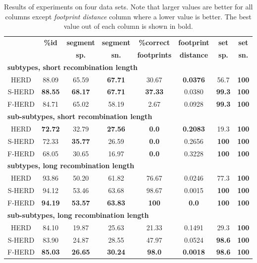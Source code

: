 \begin{table}
\begin{center}
\begin{tabular}{cccccccc}\hline
&{\bf \%id}&\bf segment&\bf segment&\bf \%correct&\bf footprint&\bf set&\bf  set\\ 
&&\bf sp.& \bf sn.& \bf footprints&\bf distance&\bf    sp.&\bf  sn.\\ 
\hline
\hline
\multicolumn{8}{l}{\bf subtypes, short recombination length}\\
HERD   &88.09& 65.59& {\bf 67.71}& 30.67& {\bf 0.0376}& 56.7&{\bf 100}\\
S-HERD &{\bf 88.55}& {\bf 68.17}& {\bf 67.71}& {\bf 37.33}& 0.0380& {\bf 99.3}&{\bf 100}\\
F-HERD &84.71& 65.02& 58.19& 2.67& 0.0928& {\bf 99.3}&{\bf 100}\\\hline
\multicolumn{8}{l}{\bf sub-subtypes, short recombination length}\\
HERD   &{\bf 72.72}& 32.79& {\bf 27.56}& {\bf 0.0}&    {\bf 0.2083}& 19.3&{\bf 100}\\
S-HERD &72.33&{\bf 35.77}& 26.59& {\bf 0.0}&    0.2656& {\bf 100}&{\bf 100}\\
F-HERD &68.05&30.65& 16.97& {\bf 0.0}&    0.3228& {\bf 100}&{\bf 100}\\\hline
\multicolumn{8}{l}{\bf subtypes, long recombination length}\\
HERD   &93.86& 50.20& 61.82& 76.67& 0.0246& 77.3&{\bf 100}\\
S-HERD &94.12& 53.46& 63.68& 98.67& 0.0015&   {\bf 100}&{\bf 100}\\
F-HERD &{\bf 94.19}& {\bf 53.57}& {\bf 63.83}& {\bf 100}&    {\bf 0.0}&
{\bf 100}&{\bf 100}\\\hline
\multicolumn{8}{l}{\bf sub-subtypes, long recombination length}\\
HERD   &84.10& 19.87& 25.63& 21.33& 0.1491& 29.3&{\bf 100}\\
S-HERD &83.90& 24.87& 28.55& 47.97& 0.0524& {\bf 98.6}&{\bf 100}\\
F-HERD &{\bf 85.03}& {\bf 26.65}& {\bf 30.24}& {\bf 98.0}&   {\bf 0.0018}& {\bf
98.6}&{\bf 100}\\
\end{tabular}
\end{center}
\caption[Results of F/S-HERD on artificial recombinants.]{Results of experiments
on four data sets. Note that larger values are better for all columns  except
{\it footprint distance} column where a lower value is better. The best value out of
each column is shown in bold.}\label{HERD:EXPTABLE}
\end{table}

